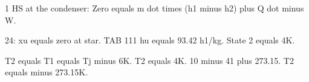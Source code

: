1 HS at the condenser:
Zero equals m dot times (h1 minus h2) plus Q dot minus W.

24: xu equals zero at star.
TAB 111 hu equals 93.42 h1/kg.
State 2 equals 4K.

T2 equals T1 equals Tj minus 6K.
T2 equals 4K.
10 minus 41 plus 273.15.
T2 equals minus 273.15K.